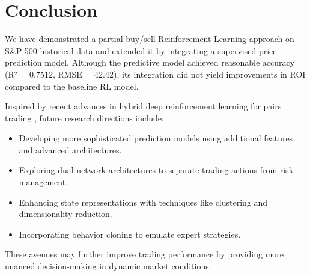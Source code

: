 \documentclass[11pt]{article}
\begin{document}
\section{Conclusion}
We have demonstrated a partial buy/sell Reinforcement Learning approach on S\&P 500 historical data and extended it by integrating a supervised price prediction model. Although the predictive model achieved reasonable accuracy (R² = 0.7512, RMSE = 42.42), its integration did not yield improvements in ROI compared to the baseline RL model.

Inspired by recent advances in hybrid deep reinforcement learning for pairs trading \citep{kim2022hybrid}, future research directions include:
\begin{itemize}
  \item Developing more sophisticated prediction models using additional features and advanced architectures.
  \item Exploring dual-network architectures to separate trading actions from risk management.
  \item Enhancing state representations with techniques like clustering and dimensionality reduction.
  \item Incorporating behavior cloning to emulate expert strategies.
\end{itemize}
These avenues may further improve trading performance by providing more nuanced decision-making in dynamic market conditions.



\end{document}
